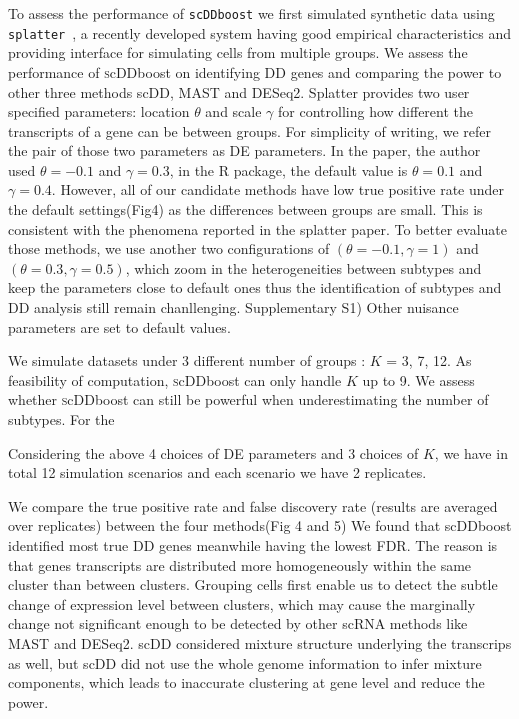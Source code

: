 \documentclass[aoas,preprint]{imsart}
\begin{document}
To assess the performance of \verb+scDDboost+ we first  simulated
synthetic data using \verb+splatter+~\citep{ref:Zappia}, 
a recently developed system having good empirical characteristics 
and providing interface for simulating cells from multiple groups. 
We assess the performance of \textsc scDDboost on identifying DD genes and comparing the power to other three methods scDD, MAST and DESeq2.
Splatter provides two user specified parameters: location $\theta$ and scale $\gamma$ for controlling how different the transcripts of a gene can be between groups. 
For simplicity of writing, we refer the pair of those two parameters as DE parameters.
In the paper, the author used $\theta = -0.1$ and $\gamma = 0.3$, in the R package, the default value is $\theta = 0.1$ and $\gamma = 0.4$.  
However, all of our candidate methods have low true positive rate under the default settings(Fig4) as the differences between groups are small. This is consistent with the phenomena reported in the splatter paper. 
To better evaluate those methods, we use another two configurations of $(\theta = -0.1, \gamma = 1)$ and $(\theta = 0.3, \gamma = 0.5)$, which zoom in the heterogeneities between subtypes
 and keep the parameters close to default ones thus the identification of subtypes and DD analysis still remain chanllenging. Supplementary S1)
Other nuisance parameters are set to default values.
 
We simulate datasets under 3 different number of groups : $K$ =  3, 7, 12.  
As feasibility of computation, \textsc scDDboost can only handle $K$ up to 9. 
We assess whether \textsc scDDboost can still be powerful when underestimating the number of subtypes. For the 

Considering the above 4 choices of DE parameters and 3 choices of $K$, we have in total 12 simulation scenarios and each scenario we have 2 replicates. 

We compare the true positive rate and false discovery rate (results are averaged over replicates)  between the four methods(Fig 4 and 5) 
We found that scDDboost identified most true DD genes meanwhile having the lowest FDR. 
The reason is that genes transcripts are distributed more homogeneously within the same cluster than between clusters. 
Grouping cells first enable us to detect the subtle change of expression level between clusters, which may cause the marginally change not significant enough to be detected by other scRNA methods like MAST and DESeq2.
scDD considered mixture structure underlying the transcrips as well, but scDD did not use the whole genome information to infer mixture components, which leads to inaccurate clustering at gene level and reduce the power. 
\end{document}
